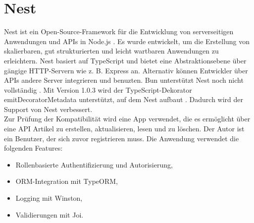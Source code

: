 \section{Nest} \label{sec:compabitility-nest}
Nest ist ein Open-Source-Framework für die Entwicklung von serverseitigen Anwendungen und APIs in Node.js \cite{Mysliwiec.2023}. Es wurde entwickelt, um die Erstellung von skalierbaren, gut strukturierten und leicht wartbaren Anwendungen zu erleichtern. Nest basiert auf TypeScript und bietet eine Abstraktionsebene über gängige HTTP-Servern wie z. B. Express an. Alternativ können Entwickler über APIs andere Server integrieren und benuzten. Bun unterstützt Nest noch nicht vollständig \cite{Sumner.2022}. Mit Version 1.0.3 wird der TypeScript-Dekorator \glqq emitDecoratorMetadata\grqq{} unterstützt, auf dem Nest aufbaut \cite{McDonnel.2023}. Dadurch wird der Support von Nest verbessert.\\

\noindent
Zur Prüfung der Kompatibilität wird eine App verwendet, die es ermöglicht über eine API Artikel zu erstellen, aktualisieren, lesen und zu löschen. Der Autor ist ein Benutzer, der sich zuvor registrieren muss. Die Anwendung verwendet die folgenden Features:

\begin{itemize}
	\item Rollenbasierte Authentifizierung und Autorisierung,
	\item ORM-Integration mit TypeORM,
	\item Logging mit Winston,
	\item Validierungen mit Joi.
\end{itemize}


